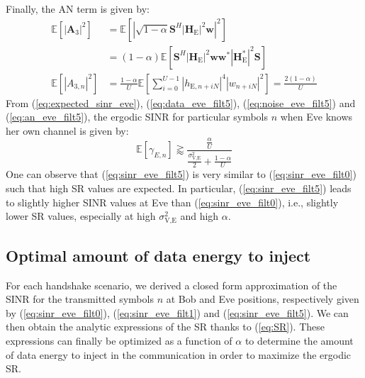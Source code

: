 \documentclass[journal,comsoc]{IEEEtran}
\newcommand{\module}[1]{\left|#1\right|}
\newcommand{\EX}[1]{\mathbb{E} \left[#1\right]}%
\newcommand{\HE}{\textbf{H}_{\text{E}}}
\newcommand{\spread}{\textbf{S}}
\newcommand{\w}{\textbf{w}}
\begin{document}
Finally, the AN term is given by:
\begin{equation}
\begin{split}
\EX{|\textbf{A}_{3}|^2} &=  \EX{\module{\sqrt{1-\alpha}\spread^H \left|\HE\right|^2 \w}^2} \\
&=(1-\alpha)\EX{\spread^H \left|\HE\right|^2 \w\w^* \left|\HE^*\right|^2\spread } \\
\EX{|A_{3,n}|^2}  &= \frac{1-\alpha}{U} \EX{\sum_{i=0}^{U-1} |h_{\text{E}, n + iN}|^4 |w_{n + iN}|^2} = \frac{2(1-\alpha)}{U}
\end{split}
\label{eq:an_eve_filt5}
\end{equation}
From (\ref{eq:expected_sinr_eve}), (\ref{eq:data_eve_filt5}), (\ref{eq:noise_eve_filt5}) and (\ref{eq:an_eve_filt5}),  the ergodic SINR for particular symbols $n$ when Eve knows her own channel is given by:
\begin{equation}
\EX{\gamma_{E,n}} \gtrapprox \frac{\frac{\alpha }{U}}{\frac{\sigma^2_{\text{V,E}}}{2} + \frac{1-\alpha}{U}}
\label{eq:sinr_eve_filt5}
\end{equation}
One can observe that (\ref{eq:sinr_eve_filt5}) is very similar to (\ref{eq:sinr_eve_filt0}) such that high SR values are expected. In particular, (\ref{eq:sinr_eve_filt5}) leads to slightly higher SINR values at Eve than (\ref{eq:sinr_eve_filt0}), i.e., slightly lower SR values, especially at high $\sigma^2_{\text{V,E}}$ and high $\alpha$. 



\subsection{Optimal amount of data energy to inject}
\label{subsec:best_alpha}
For each handshake scenario, we derived a closed form approximation of the SINR for the transmitted symbols $n$ at Bob and Eve positions, respectively given by (\ref{eq:sinr_eve_filt0}), (\ref{eq:sinr_eve_filt1}) and (\ref{eq:sinr_eve_filt5}). We can  then obtain the analytic expressions of the SR thanks to (\ref{eq:SR}). These expressions can finally be optimized as a function of $\alpha$ to determine the amount of data energy to inject in the communication in order to maximize the ergodic SR.
\end{document}
